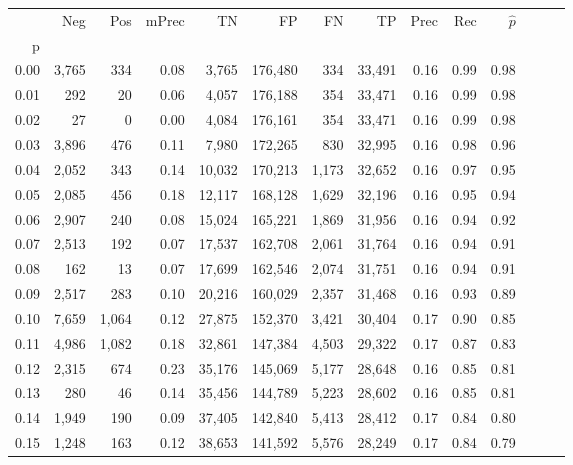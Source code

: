 \begin{tabular}{rrrrrrrrrrrrrr}
\toprule
{} &     Neg &    Pos & mPrec &       TN &       FP &      FN &      TP &  Prec &   Rec & $\hat{p}$ \\
p    &         &        &       &          &          &         &         &       &       &           \\
\midrule
0.00 &   3,765 &    334 &  0.08 &    3,765 &  176,480 &     334 &  33,491 &  0.16 &  0.99 &      0.98 \\
0.01 &     292 &     20 &  0.06 &    4,057 &  176,188 &     354 &  33,471 &  0.16 &  0.99 &      0.98 \\
0.02 &      27 &      0 &  0.00 &    4,084 &  176,161 &     354 &  33,471 &  0.16 &  0.99 &      0.98 \\
0.03 &   3,896 &    476 &  0.11 &    7,980 &  172,265 &     830 &  32,995 &  0.16 &  0.98 &      0.96 \\
0.04 &   2,052 &    343 &  0.14 &   10,032 &  170,213 &   1,173 &  32,652 &  0.16 &  0.97 &      0.95 \\
0.05 &   2,085 &    456 &  0.18 &   12,117 &  168,128 &   1,629 &  32,196 &  0.16 &  0.95 &      0.94 \\
0.06 &   2,907 &    240 &  0.08 &   15,024 &  165,221 &   1,869 &  31,956 &  0.16 &  0.94 &      0.92 \\
0.07 &   2,513 &    192 &  0.07 &   17,537 &  162,708 &   2,061 &  31,764 &  0.16 &  0.94 &      0.91 \\
0.08 &     162 &     13 &  0.07 &   17,699 &  162,546 &   2,074 &  31,751 &  0.16 &  0.94 &      0.91 \\
0.09 &   2,517 &    283 &  0.10 &   20,216 &  160,029 &   2,357 &  31,468 &  0.16 &  0.93 &      0.89 \\
0.10 &   7,659 &  1,064 &  0.12 &   27,875 &  152,370 &   3,421 &  30,404 &  0.17 &  0.90 &      0.85 \\
0.11 &   4,986 &  1,082 &  0.18 &   32,861 &  147,384 &   4,503 &  29,322 &  0.17 &  0.87 &      0.83 \\
0.12 &   2,315 &    674 &  0.23 &   35,176 &  145,069 &   5,177 &  28,648 &  0.16 &  0.85 &      0.81 \\
0.13 &     280 &     46 &  0.14 &   35,456 &  144,789 &   5,223 &  28,602 &  0.16 &  0.85 &      0.81 \\
0.14 &   1,949 &    190 &  0.09 &   37,405 &  142,840 &   5,413 &  28,412 &  0.17 &  0.84 &      0.80 \\
0.15 &   1,248 &    163 &  0.12 &   38,653 &  141,592 &   5,576 &  28,249 &  0.17 &  0.84 &      0.79 \\

\end{tabular}
